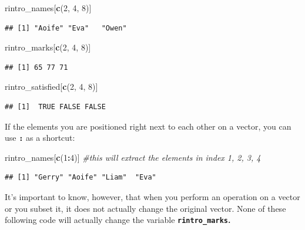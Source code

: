 \documentclass[
]{book}
\newenvironment{Shaded}{\begin{snugshade}}{\end{snugshade}}
\newcommand{\CommentTok}[1]{\textcolor[rgb]{0.56,0.35,0.01}{\textit{#1}}}
\newcommand{\DecValTok}[1]{\textcolor[rgb]{0.00,0.00,0.81}{#1}}
\newcommand{\FunctionTok}[1]{\textcolor[rgb]{0.13,0.29,0.53}{\textbf{#1}}}
\newcommand{\NormalTok}[1]{#1}
\newcommand{\SpecialCharTok}[1]{\textcolor[rgb]{0.81,0.36,0.00}{\textbf{#1}}}
\begin{document}
\begin{Shaded}
\begin{Highlighting}[]
\NormalTok{rintro\_names[}\FunctionTok{c}\NormalTok{(}\DecValTok{2}\NormalTok{, }\DecValTok{4}\NormalTok{, }\DecValTok{8}\NormalTok{)]}
\end{Highlighting}
\end{Shaded}

\begin{verbatim}
## [1] "Aoife" "Eva"   "Owen"
\end{verbatim}

\begin{Shaded}
\begin{Highlighting}[]
\NormalTok{rintro\_marks[}\FunctionTok{c}\NormalTok{(}\DecValTok{2}\NormalTok{, }\DecValTok{4}\NormalTok{, }\DecValTok{8}\NormalTok{)]}
\end{Highlighting}
\end{Shaded}

\begin{verbatim}
## [1] 65 77 71
\end{verbatim}

\begin{Shaded}
\begin{Highlighting}[]
\NormalTok{rintro\_satisfied[}\FunctionTok{c}\NormalTok{(}\DecValTok{2}\NormalTok{, }\DecValTok{4}\NormalTok{, }\DecValTok{8}\NormalTok{)]}
\end{Highlighting}
\end{Shaded}

\begin{verbatim}
## [1]  TRUE FALSE FALSE
\end{verbatim}

If the elements you are positioned right next to each other on a vector, you can use \textbf{\texttt{:}} as a shortcut:

\begin{Shaded}
\begin{Highlighting}[]
\NormalTok{rintro\_names[}\FunctionTok{c}\NormalTok{(}\DecValTok{1}\SpecialCharTok{:}\DecValTok{4}\NormalTok{)] }\CommentTok{\#this will extract the elements in index 1, 2, 3, 4}
\end{Highlighting}
\end{Shaded}

\begin{verbatim}
## [1] "Gerry" "Aoife" "Liam"  "Eva"
\end{verbatim}

It's important to know, however, that when you perform an operation on a vector or you subset it, it does not actually change the original vector. None of these following code will actually change the variable \textbf{\texttt{rintro\_marks}.}
\end{document}
